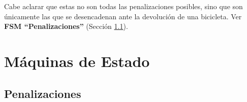 \documentclass[a4paper, 10pt, twoside]{article}
\begin{document}
Cabe aclarar que estas no son todas las penalizaciones posibles, sino que son únicamente las que se desencadenan ante la devolución de una bicicleta.
Ver {\bf FSM ``Penalizaciones''} (Sección \ref{fsm:penalizaciones}).




\section{Máquinas de Estado}

\subsection{Penalizaciones} \label{fsm:penalizaciones}
\end{document}
